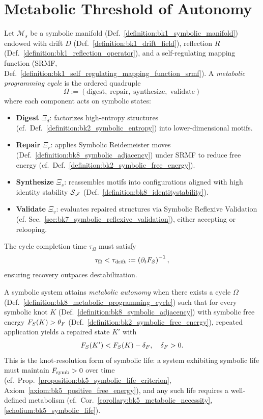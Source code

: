 \section[Metabolic Threshold]{Metabolic Threshold of Autonomy}
\label{sec:bk8_metabolic_threshold}
\begin{definition}
\label{definition:bk8_metabolic_programming_cycle}
Let $\mathcal{M}_s$ be a symbolic manifold (Def.~\ref{definition:bk1_symbolic_manifold}) endowed with drift $D$ (Def.~\ref{definition:bk1_drift_field}), reflection $R$ (Def.~\ref{definition:bk1_reflection_operator}), and a self-regulating mapping function (SRMF, Def.~\ref{definition:bk1_self_regulating_mapping_function_srmf}). A \emph{metabolic programming cycle} is the ordered quadruple
\[
\Omega := (\text{digest},\; \text{repair},\; \text{synthesize},\; \text{validate})
\]
where each component acts on symbolic states:
\begin{itemize}
  \item \textbf{Digest} $\Xi_d$: factorizes high-entropy structures (cf.~Def.~\ref{definition:bk2_symbolic_entropy}) into lower-dimensional motifs.
  \item \textbf{Repair} $\Xi_r$: applies Symbolic Reidemeister moves (Def.~\ref{definition:bk8_symbolic_adjacency}) under SRMF to reduce free energy (cf.~Def.~\ref{definition:bk2_symbolic_free_energy}).
  \item \textbf{Synthesize} $\Xi_s$: reassembles motifs into configurations aligned with high identity stability $\mathcal{S}_{\mathscr{I}}$ (Def.~\ref{definition:bk8_identitystability}).
  \item \textbf{Validate} $\Xi_v$: evaluates repaired structures via Symbolic Reflexive Validation (cf. Sec.~\ref{sec:bk7_symbolic_reflexive_validation}), either accepting or relooping.
\end{itemize}
The cycle completion time $\tau_\Omega$ must satisfy
\[
\tau_\Omega < \tau_{\mathrm{drift}} := \left( \partial_t F_S \right)^{-1},
\]
ensuring recovery outpaces destabilization.
\end{definition}
\begin{axiom}
\label{axiom:bk8_mutation_phase_shift}
A symbolic system attains \emph{metabolic autonomy} when there exists a cycle $\Omega$ (Def.~\ref{definition:bk8_metabolic_programming_cycle}) such that for every symbolic knot $K$ (Def.~\ref{definition:bk8_symbolic_adjacency}) with symbolic free energy $F_S(K) > \theta_F$ (Def.~\ref{definition:bk2_symbolic_free_energy}), repeated application yields a repaired state $K'$ with
\[
F_S(K') < F_S(K) - \delta_F, \quad \delta_F > 0.
\]
This is the knot-resolution form of symbolic life: a system exhibiting symbolic life must maintain $F_{\mathrm{symb}} > 0$ over time (cf.~Prop.~\ref{proposition:bk5_symbolic_life_criterion}, Axiom~\ref{axiom:bk5_positive_free_energy}), and any such life requires a well-defined metabolism (cf.~Cor.~\ref{corollary:bk5_metabolic_necessity}, \ref{scholium:bk5_symbolic_life}).
\end{axiom}
